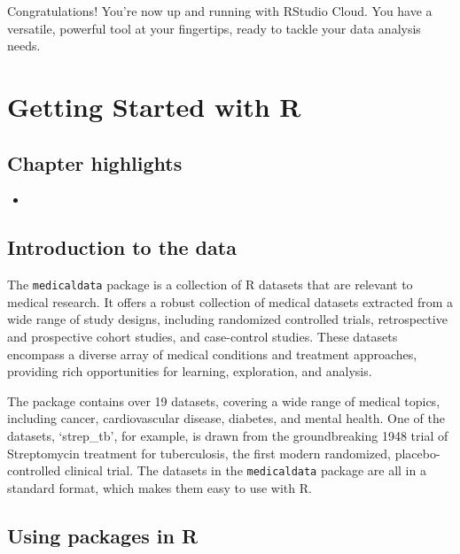 \documentclass[
  letterpaper,
  DIV=11,
  numbers=noendperiod]{scrreprt}
\providecommand{\tightlist}{%
  \setlength{\itemsep}{0pt}\setlength{\parskip}{0pt}}\usepackage{longtable,booktabs,array}
\begin{document}
Congratulations! You're now up and running with RStudio Cloud. You have
a versatile, powerful tool at your fingertips, ready to tackle your data
analysis needs.


\hypertarget{getting-started-with-r}{%
\chapter{Getting Started with R}\label{getting-started-with-r}}

\hypertarget{chapter-highlights}{%
\section{Chapter highlights}\label{chapter-highlights}}

\begin{itemize}
\tightlist
\item
\end{itemize}

\hypertarget{introduction-to-the-data}{%
\section{Introduction to the data}\label{introduction-to-the-data}}

The \texttt{medicaldata} package is a collection of R datasets that are
relevant to medical research. It offers a robust collection of medical
datasets extracted from a wide range of study designs, including
randomized controlled trials, retrospective and prospective cohort
studies, and case-control studies. These datasets encompass a diverse
array of medical conditions and treatment approaches, providing rich
opportunities for learning, exploration, and analysis.

The package contains over 19 datasets, covering a wide range of medical
topics, including cancer, cardiovascular disease, diabetes, and mental
health. One of the datasets, `strep\_tb', for example, is drawn from the
groundbreaking 1948 trial of Streptomycin treatment for tuberculosis,
the first modern randomized, placebo-controlled clinical trial. The
datasets in the \texttt{medicaldata} package are all in a standard
format, which makes them easy to use with R.

\hypertarget{using-packages-in-r}{%
\section{Using packages in R}\label{using-packages-in-r}}
\end{document}
